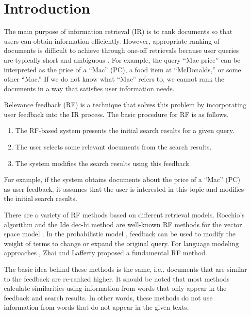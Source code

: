 \documentclass[english]{jnlp_1.4_rep}
\begin{document}
\maketitle

\section{Introduction}
\label{sec:intr}

The main purpose of information retrieval (IR) is to rank documents so
that users can obtain information efficiently. However, appropriate
ranking of documents is difficult to achieve through one-off retrievals
because user queries are typically short and
ambiguous \cite{Jansen2000}. For example, the query ``Mac price'' can be
interpreted as the price of a ``Mac'' (PC), a food item at
``McDonalds,'' or some other ``Mac.'' If we do not know what ``Mac''
refers to, we cannot rank the documents in a way that satisfies user
information needs.

Relevance feedback (RF) is a technique that solves this problem by
incorporating user feedback into the IR process. The basic procedure for
RF is as follows.
\begin{enumerate}
 \item The RF-based system presents the initial search results for a
       given query.
 \item The user selects some relevant documents from the search results.
 \item The system modifies the search results using this feedback.
\end{enumerate}
For example, if the system obtains documents about the price of a
``Mac'' (PC) as user feedback, it assumes that the user is interested in
this topic and modifies the initial search results.

There are a variety of RF methods based on different retrieval
models. Rocchio's algorithm \cite{Rocchio1971} and the Ide dec-hi
method \cite{Ide1971} are well-known RF methods for the vector space
model \cite{Salton1975}. In the probabilistic
model \cite{SparckJones2000}, feedback can be used to modify the weight
of terms to change or expand the original query. For language modeling
approaches \cite{Ponte1998}, Zhai and Lafferty \citeyear{Zhai2001}
proposed a fundamental RF method.

The basic idea behind these methods is the same, i.e., documents that
are similar to the feedback are re-ranked higher. It should be noted
that most methods calculate similarities using information from words
that only appear in the feedback and search results. In other words,
these methods do not use information from words that do not appear in
the given texts.
\end{document}
